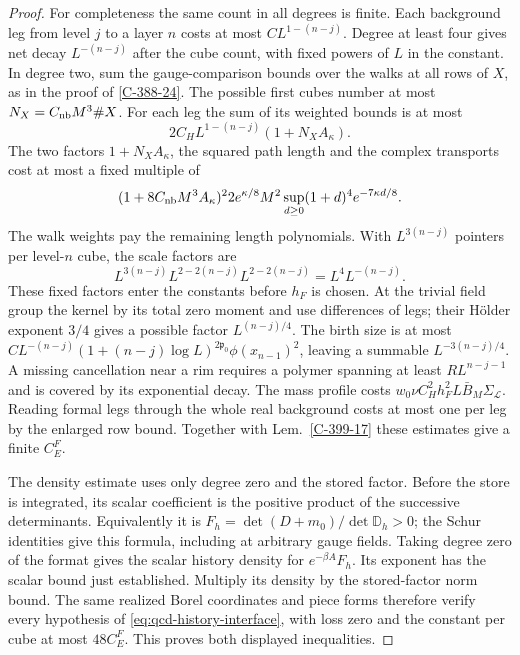\documentclass[11pt,letterpaper,reqno]{amsart}
\theoremstyle{definition}
\theoremstyle{remark}
\begin{document}
\begin{proof}
For completeness the same count in all degrees is finite.
Each background leg from level $j$ to a layer $n$ costs at most
$CL^{1-(n-j)}$. Degree at least four gives net decay
$L^{-(n-j)}$ after the cube count, with fixed powers of $L$
in the constant. In degree two, sum the gauge-comparison
bounds over the walks at all rows of $X$, as in the proof
of \cref{C-388-24}. The possible first cubes number at most
$N_X=C_{\rm nb}M^3\#X$. For each leg the sum of its
weighted bounds is at most
\[
 2C_HL^{1-(n-j)}(1+N_XA_\kappa).
\]
The two factors $1+N_XA_\kappa$, the squared path length
and the complex transports cost at most a fixed multiple of
\[
 (1+8C_{\rm nb}M^3A_\kappa)^2
 2e^{\kappa/8}M^2\sup_{d\ge0}(1+d)^4e^{-7\kappa d/8}.
\]
The walk weights pay the remaining length polynomials.
With $L^{3(n-j)}$ pointers per level-$n$ cube, the scale
factors are
\[
 L^{3(n-j)}L^{2-2(n-j)}L^{2-2(n-j)}=L^4L^{-(n-j)}.
\]
These fixed factors enter the constants before $h_F$ is
chosen. At the trivial field group the kernel by its total
zero moment and use differences of legs; their H\"older
exponent $3/4$ gives a possible factor $L^{(n-j)/4}$.
The birth size is at most
$CL^{-(n-j)}(1+(n-j)\log L)^{2\mathfrak p_0}
\phi(x_{n-1})^2$, leaving a summable $L^{-3(n-j)/4}$.
A missing cancellation near a rim requires a polymer spanning
at least $RL^{n-j-1}$ and is covered by its exponential
decay. The mass profile costs
$w_0\nu C_H^2h_F^2L\bar B_M\Sigma_{\mathcal L}$.
Reading formal legs through the whole real background costs
at most one per leg by the enlarged row bound. Together with
Lem.~\ref{C-399-17} these estimates give a finite $C_E^F$.

The density estimate uses only degree zero and the stored
factor. Before the store is integrated, its scalar coefficient
is the positive product of the successive determinants.
Equivalently it is
$F_h=\det(D+m_0)/\det\mathbb D_h>0$; the Schur identities
give this formula, including at arbitrary gauge fields.
Taking degree zero of the format gives the scalar history
density for $e^{-\beta A}F_h$. Its exponent has the scalar
bound just established. Multiply its density by the
stored-factor norm bound. The same realized Borel coordinates
and piece forms therefore verify every hypothesis of
\eqref{eq:qcd-history-interface}, with loss zero and the
constant per cube at most $48C_E^F$.
This proves both displayed inequalities.
\end{proof}
\end{document}
